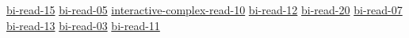 \hyperref[sec:bi-read-15]{bi-read-15}
\hyperref[sec:bi-read-05]{bi-read-05}
\hyperref[sec:interactive-complex-read-10]{interactive-complex-read-10}
\hyperref[sec:bi-read-12]{bi-read-12}
\hyperref[sec:bi-read-20]{bi-read-20}
\hyperref[sec:bi-read-07]{bi-read-07}
\hyperref[sec:bi-read-13]{bi-read-13}
\hyperref[sec:bi-read-03]{bi-read-03}
\hyperref[sec:bi-read-11]{bi-read-11}
